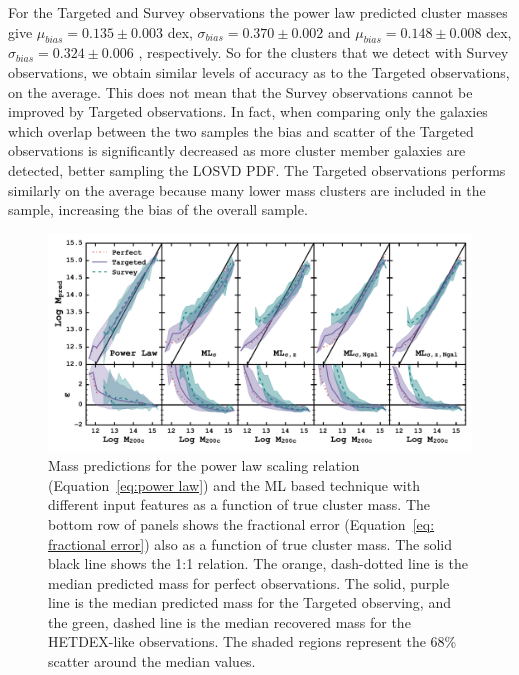 For the Targeted and Survey observations the power law predicted cluster masses give $\mu_{bias} =0.135\pm{0.003}$ dex, $\sigma_{bias} = 0.370\pm{0.002}$ and $\mu_{bias} =0.148\pm{0.008}$ dex, $\sigma_{bias} = 0.324\pm{0.006}$ , respectively. So for the clusters that we detect with Survey observations, we obtain similar levels of accuracy as to the Targeted observations, on the average. This does not mean that the Survey observations cannot be improved by Targeted observations. In fact, when comparing only the galaxies which overlap between the two samples the bias and scatter of the Targeted observations is significantly decreased as more cluster member galaxies are detected, better sampling the LOSVD PDF. The Targeted observations performs similarly on the average because many lower mass clusters are included in the sample, increasing the bias of the overall sample.

\begin{figure}
	\begin{center}
		\includegraphics[width=\textwidth]{figures1/MLcomparison.pdf}
	\end{center}
	\caption[ML based cluster mass predictions]{Mass predictions for the power law scaling relation (Equation~\ref{eq:power law}) and the ML based technique with different input features as a function of true cluster mass. The bottom row of panels shows the fractional error (Equation~\ref{eq: fractional error}) also as a function of true cluster mass. The solid black line shows the 1:1 relation. The orange, dash-dotted line is the median predicted mass for perfect observations. The solid, purple line is the median predicted mass for the Targeted observing, and the green, dashed line is the median recovered mass for the HETDEX-like observations. The shaded regions represent the 68\% scatter around the median values.}
	\label{fig: ML comparison} 
\end{figure}

